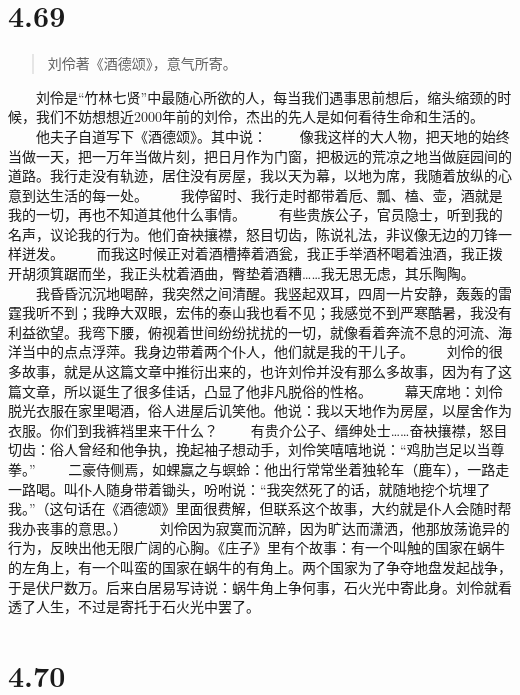 \documentclass[]{book}
\begin{document}
\section{4.69}\label{section-246}

\begin{quote}
刘伶著《酒德颂》，意气所寄。
\end{quote}

　　刘伶是``竹林七贤''中最随心所欲的人，每当我们遇事思前想后，缩头缩颈的时候，我们不妨想想近2000年前的刘伶，杰出的先人是如何看待生命和生活的。
　　他夫子自道写下《酒德颂》。其中说：
　　像我这样的大人物，把天地的始终当做一天，把一万年当做片刻，把日月作为门窗，把极远的荒凉之地当做庭园间的道路。我行走没有轨迹，居住没有房屋，我以天为幕，以地为席，我随着放纵的心意到达生活的每一处。
　　我停留时、我行走时都带着卮、瓢、榼、壶，酒就是我的一切，再也不知道其他什么事情。
　　有些贵族公子，官员隐士，听到我的名声，议论我的行为。他们奋袂攘襟，怒目切齿，陈说礼法，非议像无边的刀锋一样迸发。
　　而我这时候正对着酒槽捧着酒瓮，我正手举酒杯喝着浊酒，我正拨开胡须箕踞而坐，我正头枕着酒曲，臀垫着酒糟\ldots{}\ldots{}我无思无虑，其乐陶陶。
　　我昏昏沉沉地喝醉，我突然之间清醒。我竖起双耳，四周一片安静，轰轰的雷霆我听不到；我睁大双眼，宏伟的泰山我也看不见；我感觉不到严寒酷暑，我没有利益欲望。我弯下腰，俯视着世间纷纷扰扰的一切，就像看着奔流不息的河流、海洋当中的点点浮萍。我身边带着两个仆人，他们就是我的干儿子。
　　刘伶的很多故事，就是从这篇文章中推衍出来的，也许刘伶并没有那么多故事，因为有了这篇文章，所以诞生了很多佳话，凸显了他非凡脱俗的性格。
　　幕天席地：刘伶脱光衣服在家里喝酒，俗人进屋后讥笑他。他说：我以天地作为房屋，以屋舍作为衣服。你们到我裤裆里来干什么？
　　有贵介公子、缙绅处士\ldots{}\ldots{}奋袂攘襟，怒目切齿：俗人曾经和他争执，挽起袖子想动手，刘伶笑嘻嘻地说：``鸡肋岂足以当尊拳。''
　　二豪侍侧焉，如蜾蠃之与螟蛉：他出行常常坐着独轮车（鹿车），一路走一路喝。叫仆人随身带着锄头，吩咐说：``我突然死了的话，就随地挖个坑埋了我。''（这句话在《酒德颂》里面很费解，但联系这个故事，大约就是仆人会随时帮我办丧事的意思。）
　　刘伶因为寂寞而沉醉，因为旷达而潇洒，他那放荡诡异的行为，反映出他无限广阔的心胸。《庄子》里有个故事：有一个叫触的国家在蜗牛的左角上，有一个叫蛮的国家在蜗牛的有角上。两个国家为了争夺地盘发起战争，于是伏尸数万。后来白居易写诗说：蜗牛角上争何事，石火光中寄此身。刘伶就看透了人生，不过是寄托于石火光中罢了。

\section{4.70}\label{section-247}
\end{document}
